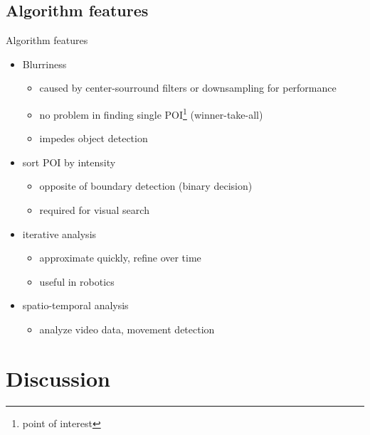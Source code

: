 \documentclass[compress,t]{beamer}
\begin{document}
\subsection{Algorithm features}
\begin{frame}{Algorithm features}
    \begin{itemize}
        \item Blurriness
        \begin{itemize}
            \item caused by center-sourround filters or downsampling for performance
            \item no problem in finding single POI\footnote{point of interest} (winner-take-all)
            \item impedes object detection
        \end{itemize}
        \pause

        \item sort POI by intensity
        \begin{itemize}
            \item opposite of boundary detection (binary decision)
            \item required for visual search
        \end{itemize}
        \pause

        \item iterative analysis
        \begin{itemize}
            \item approximate quickly, refine over time
            \item useful in robotics
        \end{itemize}
        \pause

        \item spatio-temporal analysis
        \begin{itemize}
            \item analyze video data, movement detection
        \end{itemize}
    \end{itemize}
\end{frame}


\section{Discussion}
\end{document}
